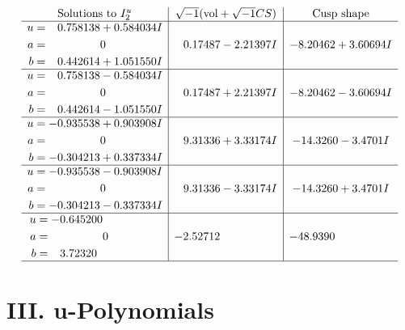 \documentclass[1p]{elsarticle_modified}
\theoremstyle{definition}
\newcommand{\I}{\sqrt{-1}}
\begin{document}
$$\begin{array}{c|c|c}  
\text{Solutions to }I^u_{2}& \I (\text{vol} + \sqrt{-1}CS) & \text{Cusp shape}\\
 \hline 
\begin{aligned}
u &= \phantom{-}0.758138 + 0.584034 I \\
a &= \phantom{-0.000000 } 0 \\
b &= \phantom{-}0.442614 + 1.051550 I\end{aligned}
 & \phantom{-}0.17487 - 2.21397 I & -8.20462 + 3.60694 I \\ \hline\begin{aligned}
u &= \phantom{-}0.758138 - 0.584034 I \\
a &= \phantom{-0.000000 } 0 \\
b &= \phantom{-}0.442614 - 1.051550 I\end{aligned}
 & \phantom{-}0.17487 + 2.21397 I & -8.20462 - 3.60694 I \\ \hline\begin{aligned}
u &= -0.935538 + 0.903908 I \\
a &= \phantom{-0.000000 } 0 \\
b &= -0.304213 + 0.337334 I\end{aligned}
 & \phantom{-}9.31336 + 3.33174 I & -14.3260 - 3.4701 I \\ \hline\begin{aligned}
u &= -0.935538 - 0.903908 I \\
a &= \phantom{-0.000000 } 0 \\
b &= -0.304213 - 0.337334 I\end{aligned}
 & \phantom{-}9.31336 - 3.33174 I & -14.3260 + 3.4701 I \\ \hline\begin{aligned}
u &= -0.645200\phantom{ +0.000000I} \\
a &= \phantom{-0.000000 } 0 \\
b &= \phantom{-}3.72320\phantom{ +0.000000I}\end{aligned}
 & -2.52712\phantom{ +0.000000I} & -48.9390\phantom{ +0.000000I}\\
 \hline 
 \end{array}$$\newpage
\newpage\renewcommand{\arraystretch}{1}
\centering \section*{ III. u-Polynomials}
\end{document}
